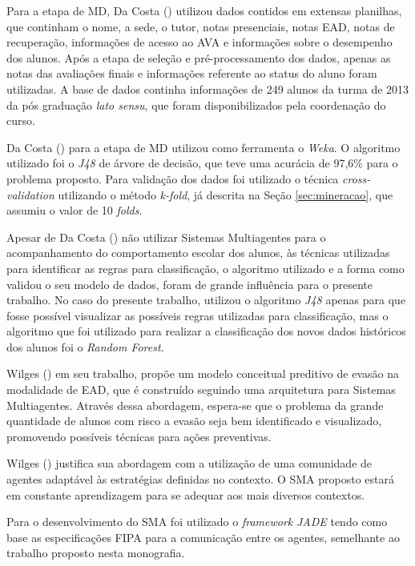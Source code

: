 Para a etapa de MD, Da Costa (\citeyear{da2012minerando}) utilizou dados contidos em extensas planilhas, que continham o nome, a sede, o tutor, notas presenciais, notas EAD, notas de recuperação, informações de acesso ao AVA e informações sobre o desempenho dos alunos. Após a etapa de seleção e pré-processamento dos dados, apenas as notas das avaliações finais e informações referente ao status do aluno foram utilizadas. A base de dados continha informações de 249 alunos da turma de 2013 da pós graduação \textit{lato sensu}, que foram disponibilizados pela coordenação do curso.

Da Costa (\citeyear{da2012minerando}) para a etapa de MD utilizou como ferramenta o \textit{Weka}. O algoritmo utilizado foi o \textit{J48} de árvore de decisão, que teve uma acurácia de 97,6\% para o problema proposto.
Para validação dos dados foi utilizado o técnica \textit{cross-validation} utilizando o método \textit{k-fold}, já descrita na Seção \ref{sec:mineracao}, que assumiu o valor de 10 \textit{folds}.

Apesar de Da Costa (\citeyear{da2012minerando}) não utilizar Sistemas Multiagentes para o acompanhamento do comportamento escolar dos alunos, às técnicas utilizadas para identificar as regras para classificação, o algoritmo utilizado e a forma como validou o seu modelo de dados, foram de grande influência para o presente trabalho. No caso do presente trabalho, utilizou o algoritmo \textit{J48} apenas para que fosse possível visualizar as possíveis regras utilizadas para classificação, mas o algoritmo que foi utilizado para realizar a classificação dos novos dados históricos dos alunos foi o \textit{Random Forest}.

\label{ref:wilges}

Wilges (\citeyear{wilges2010sistemas}) em seu trabalho, propõe um modelo conceitual preditivo de evasão na modalidade de EAD, que é construído seguindo uma arquitetura para Sistemas Multiagentes. Através dessa abordagem, espera-se que o problema da grande quantidade de alunos com risco a evasão seja bem identificado e visualizado, promovendo possíveis técnicas para ações preventivas.

Wilges (\citeyear{wilges2010sistemas}) justifica sua abordagem com a utilização de uma comunidade de agentes adaptável às estratégias definidas no contexto. O SMA proposto estará em constante aprendizagem para se adequar aos mais diversos contextos.

Para o desenvolvimento do SMA foi utilizado o \textit{framework} \textit{JADE} tendo como base as especificações FIPA para a comunicação entre os agentes, semelhante ao trabalho proposto
nesta monografia.

